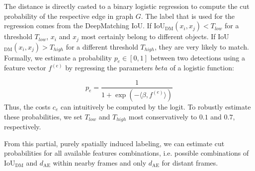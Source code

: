 The distance is directly casted to a binary logistic regression to compute the cut probability of the respective edge in graph $G$. 
The label that is used for the regression comes from the DeepMatching IoU. 
If IoU$_{\mathrm{DM}}(x_i,x_j)<T_{low}$ for a threshold $T_{low}$, $x_i$ and $x_j$ most certainly belong to different objects. 
If IoU$_{\mathrm{DM}}(x_i,x_j)>T_{high}$ for a different threshold $T_{high}$, they are very likely to match. 
Formally, we estimate a probability $p_e \in [0,1]$ between two detections using a feature vector $f^{(e)}$ by regressing the parameters $beta$  of a logistic function:

\begin{equation} 
\label{eq:regression} p_e = \frac{1}{1+\exp(-\langle\beta, f^{(e)}\rangle)}
\end{equation} 
Thus, the costs $c_e$ can intuitively be computed by the logit. To robustly estimate these probabilities, we set $T_{low}$ and $T_{high}$ most conservatively to $0.1$ and $0.7$, respectively. 

From this partial, purely spatially induced labeling, we can estimate cut probabilities for all available features combinations, i.e. possible combinations of IoU$_\mathrm{DM}$ and $d_{\mathrm{AE}}$ within nearby frames and only $d_{\mathrm{AE}}$ for distant frames.